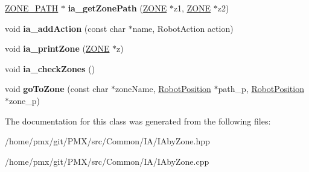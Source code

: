 \begin{DoxyCompactItemize}
\item 
\mbox{\label{classIAbyZone_a493dabd2871ce12c519560a9e9327399}} 
\hyperlink{structZONE__PATH}{Z\+O\+N\+E\+\_\+\+P\+A\+TH} $\ast$ {\bfseries ia\+\_\+get\+Zone\+Path} (\hyperlink{structZONE}{Z\+O\+NE} $\ast$z1, \hyperlink{structZONE}{Z\+O\+NE} $\ast$z2)
\item 
\mbox{\label{classIAbyZone_a188b171878cde5f977eb7b761c9fe4d4}} 
void {\bfseries ia\+\_\+add\+Action} (const char $\ast$name, Robot\+Action action)
\item 
\mbox{\label{classIAbyZone_a715310e6494ee7f94c530960df8ebfaf}} 
void {\bfseries ia\+\_\+print\+Zone} (\hyperlink{structZONE}{Z\+O\+NE} $\ast$z)
\item 
\mbox{\label{classIAbyZone_a7931d32abc21501dffb48b09ccc25ed0}} 
void {\bfseries ia\+\_\+check\+Zones} ()
\item 
\mbox{\label{classIAbyZone_a0300f37d24719e6296c2d3f6a9e66001}} 
void {\bfseries go\+To\+Zone} (const char $\ast$zone\+Name, \hyperlink{structRobotPosition}{Robot\+Position} $\ast$path\+\_\+p, \hyperlink{structRobotPosition}{Robot\+Position} $\ast$zone\+\_\+p)
\end{DoxyCompactItemize}


The documentation for this class was generated from the following files\+:\begin{DoxyCompactItemize}
\item 
/home/pmx/git/\+P\+M\+X/src/\+Common/\+I\+A/I\+Aby\+Zone.\+hpp\item 
/home/pmx/git/\+P\+M\+X/src/\+Common/\+I\+A/I\+Aby\+Zone.\+cpp\end{DoxyCompactItemize}
